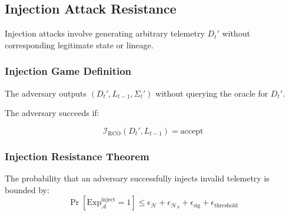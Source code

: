 \subsection{Injection Attack Resistance}

Injection attacks involve generating arbitrary telemetry $D_t'$ without corresponding legitimate state or lineage.

\subsubsection{Injection Game Definition}

The adversary outputs $(D_t', L_{t-1}, \Sigma_t')$ without querying the oracle for $D_t'$.

The adversary succeeds if:

\begin{equation}
\mathcal{I}_{\text{RCO}}(D_t', L_{t-1}) = \text{accept}
\end{equation}

\subsubsection{Injection Resistance Theorem}

\begin{theorem}
The probability that an adversary successfully injects invalid telemetry is bounded by:
\[
\Pr[\text{Exp}_{\mathcal{A}}^{\text{inject}} = 1] \leq \epsilon_{\mathcal{H}} + \epsilon_{\mathcal{H}_S} + \epsilon_{\text{sig}} + \epsilon_{\text{threshold}}
\]
\end{theorem}


